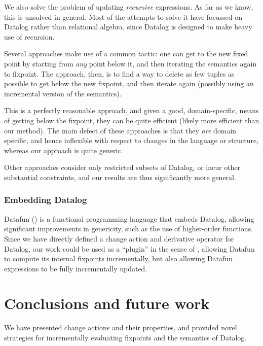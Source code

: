 We also solve the problem of updating \emph{recursive} expressions. As far as we
know, this is unsolved in general. Most of the attempts to solve it have
focussed on Datalog rather than relational algebra, since Datalog is designed to
make heavy use of recursion. 

Several approaches
\autocites{gupta1993maintaining}{harrison1992maintenance}
make use of a common tactic: one can get to the new fixed
point by starting from \emph{any} point below it, and then iterating the
semantics again to fixpoint. The approach, then, is to find a way to delete as
few tuples as possible to get below the new fixpoint, and then iterate again
(possibly using an incremental version of the semantics).

This is a perfectly reasonable approach, and given a good, domain-specific,
means of getting below the fixpoint, they can be quite efficient (likely more
efficient than our method). The main defect of these approaches is that they
\emph{are} domain specific, and hence inflexible with respect to changes in the
language or structure, whereas our approach is quite generic.

Other approaches \autocites{dong2000incremental}{urpi1992method} consider only
restricted subsets of Datalog, or incur other substantial constraints, and our results
are thus significantly more general.

\subsubsection{Embedding Datalog}
\label{sec:embeddingDatalog}

Datafun (\textcite{arntz2016datafun}) is a functional programming language that embeds
Datalog, allowing significant improvements in genericity, such as the use of
higher-order functions. Since we have directly defined a change action and
derivative operator for Datalog, our work could be used as a ``plugin'' in the sense
of \citeauthor{cai2014changes}, allowing Datafun to compute its internal fixpoints
incrementally, but also allowing Datafun expressions to be fully incrementally updated.

\section{Conclusions and future work}

We have presented change actions and their properties, and provided novel
strategies for incrementally evaluating fixpoints and the semantics of Datalog.

